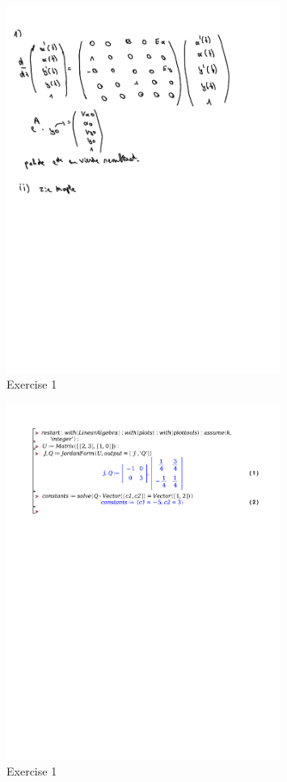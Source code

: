 \documentclass[a4paper]{report}
\begin{document}
\begin{figure}[H]
	\centering
	\includegraphics[width=0.8\textwidth]{assets/wc_3_ex_1.pdf}
	\caption{Exercise 1}
	\label{fig:bord_3_ex_1}
\end{figure}

\begin{figure}[H]
	\centering
	\includegraphics[width=0.8\textwidth]{exercises/bord_3_ex_1.pdf}
	\caption{Exercise 1}
	\label{fig:bord_3_ex_1}
\end{figure}
\end{document}
